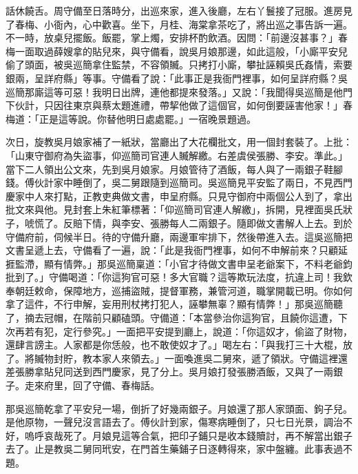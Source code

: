 話休饒舌。周守備至日落時分，出巡來家，進入後廳，左右丫鬟接了冠服。進房見了春梅、小衙內，心中歡喜。坐下，月桂、海棠拿茶吃了，將出巡之事告訴一遍。不一時，放桌兒擺飯。飯罷，掌上燭，安排杯酌飲酒。因問：「前邊沒甚事？」春梅一面取過薛嫂拿的貼兒來，與守備看，說吳月娘那邊，如此這般，「小廝平安兒偷了頭面，被吳巡簡拿住監禁，不容領贓。只拷打小廝，攀扯誣賴吳氏姦情，索要銀兩，呈詳府縣」等事。守備看了說：「此事正是我衙門裡事，如何呈詳府縣？吳巡簡那廝這等可惡！我明日出牌，連他都提來發落。」又說：「我聞得吳巡簡是他門下伙計，只因往東京與蔡太題進禮，帶挈他做了這個官，如何倒要誣害他家！」春梅道：「正是這等說。你替他明日處處罷。」一宿晚景題過。

次日，旋教吳月娘家補了一紙狀，當廳出了大花欄批文，用一個封套裝了。上批：「山東守御府為失盜事，仰巡簡司官連人贓解繳。右差虞侯張勝、李安。準此。」當下二人領出公文來，先到吳月娘家。月娘管待了酒飯，每人與了一兩銀子鞋腳錢。傅伙計家中睡倒了，吳二舅跟隨到巡簡司。吳巡簡見平安監了兩日，不見西門慶家中人來打點，正教吏典做文書，申呈府縣。只見守御府中兩個公人到了，拿出批文來與他。見封套上朱紅筆標著：「仰巡簡司官連人解繳」，拆開，見裡面吳氏狀子，唬慌了。反賠下情，與李安、張勝每人二兩銀子。隨即做文書解人上去。到於守備府前，伺候半日。待的守備升廳，兩邊軍牢排下，然後帶進入去。這吳巡簡把文書呈遞上去，守備看了一遍，說：「此是我衙門裡事，如何不申解前來？只顧延捱監滯，顯有情弊。」那吳巡簡稟道：「小官才待做文書申呈老爺案下，不料老爺鈞批到了。」守備喝道：「你這狗官可惡！多大官職？這等欺玩法度，抗違上司！我欽奉朝廷敕命，保障地方，巡捕盜賊，提督軍務，兼管河道，職掌開載已明。你如何拿了這件，不行申解，妄用刑杖拷打犯人，誣攀無辜？顯有情弊！」那吳巡簡聽了，摘去冠帽，在階前只顧磕頭。守備道：「本當參治你這狗官，且饒你這遭，下次再若有犯，定行參究。」一面把平安提到廳上，說道：「你這奴才，偷盜了財物，還肆言謗主。人家都是你恁般，也不敢使奴才了。」喝左右：「與我打三十大棍，放了。將贓物封貯，教本家人來領去。」一面喚進吳二舅來，遞了領狀。守備這裡還差張勝拿貼兒同送到西門慶家，見了分上。吳月娘打發張勝酒飯，又與了一兩銀子。走來府里，回了守備、春梅話。

那吳巡簡乾拿了平安兒一場，倒折了好幾兩銀子。月娘還了那人家頭面、鉤子兒。是他原物，一聲兒沒言語去了。傅伙計到家，傷寒病睡倒了，只七日光景，調治不好，嗚呼哀哉死了。月娘見這等合氣，把印子鋪只是收本錢贖討，再不解當出銀子去了。止是教吳二舅同玳安，在門首生藥鋪子日逐轉得來，家中盤纏。此事表過不題。

